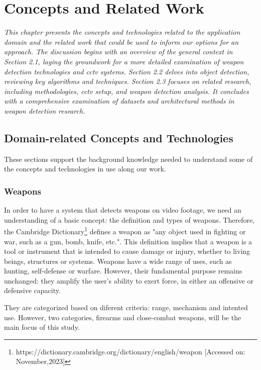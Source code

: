 
\renewcommand{\arraystretch}{2}
\renewcommand{\figurename}{Figure}
\chapter{Concepts and Related Work}
\label{chapter:literarure}

\newenvironment{literature}
{\quote\itshape}
{\endquote}

\begin{literature}
This chapter presents the concepts and technologies related to the application domain and the related work that could 
be used to inform our options for an approach.
 The discussion begins with an overview of the general context in Section 2.1, laying the 
 groundwork for a more detailed examination of weapon detection technologies and \ac{cctv} systems. Section 2.2 
 delves into object detection, reviewing key algorithms and techniques. Section 2.3 focuses on related research, 
 including methodologies, \ac{cctv} setup, and weapon detection analysis. It concludes with a comprehensive 
 examination of datasets and architectural methods in weapon detection research.
\end{literature}

\section{Domain-related Concepts and Technologies}
These sections support the background knowledge needed to understand some of the concepts and technologies in use along our work.
\subsection{Weapons}
In order to have a system that detects weapons on video footage, we need an understanding of a basic concept: 
the definition and types of weapons.  Therefore, the Cambridge Dictionary\footnote{https://dictionary.cambridge.org/dictionary/english/weapon  [Accessed on: November,2023]} defines a weapon 
as "any object used in fighting or war, such as a gun, bomb, knife, etc.". This definition implies that a weapon 
is a tool or instrument  that is intended to cause damage or injury, whether to 
living beings, structures or systems. Weapons have a wide range of uses, such as hunting, self-defense or warfare. 
However, their fundamental purpose 
remains unchanged: they amplify the user's ability to exert force, in either an offensive or defensive capacity.

They are categorized based on diferent criteria: range, mechanism and intented use.
However, two categories, firearms and close-combat weapons, will be the main focus of this study.

